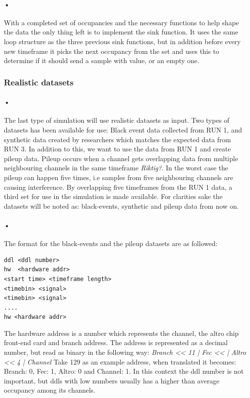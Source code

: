 \documentclass[a4paper, 12pt]{report}
\begin{document}
\paragraph{•}
With a completed set of occupancies and the necessary functions to help shape the data the only thing left is to implement the sink function.
It uses the same loop structure as the three previous sink functions, but in addition before every new timeframe it picks the next occupancy from the set and uses this to determine if it should send a sample with value, or an empty one.

\subsubsection{Realistic datasets}
\label{subsubsec:real-data}

\paragraph{•}
The last type of simulation will use realistic datasets as input. %
Two types of datasets has been available for use: Black event data collected from RUN 1, and synthetic data created by researchers which matches the expected data from RUN 3.
In addition to this, we want to use the data from RUN 1 and create pileup data.
Pileup occurs when a channel gets overlapping data from multiple neighbouring channels in the same timeframe \textit{Riktig?}.
In the worst case the pileup can happen five times, i.e samples from five neighbouring channels are causing interference.
By overlapping five timeframes from the RUN 1 data, a third set for use in the simulation is made available.
For clarities sake the datasets will be noted as: black-events, synthetic and pileup data from now on.
 
\paragraph{•} 
The format for the black-events and the pileup datasets are as followed:
 \begin{lstlisting}[caption=Data container., label=lst:black-event-format]
ddl <ddl number>
hw  <hardware addr>
<start time> <timeframe length>
<timebin> <signal>
<timebin> <signal>
....
hw <hardware addr>
\end{lstlisting}
The hardware address is a number which represents the channel, the \gls{altro} chip front-end card and branch address.
The address is represented as a decimal number, but read as binary in the following way:
\textit{Branch << 11 | Fec << | Altro << 4 | Channel}
Take 129 as an example address, when translated it becomes: Branch: 0, Fec: 1, Altro: 0 and Channel: 1.
In this context the ddl number is not important, but ddls with low numbers usually has a higher than average occupancy among its channels.
\end{document}
